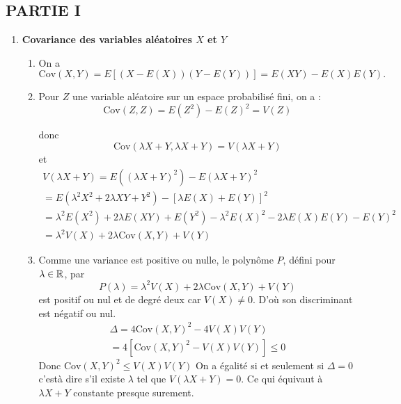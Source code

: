 \subsection*{PARTIE I}

\begin{enumerate}
\item \textbf{Covariance des variables al\'eatoires $X$ et $Y$}

\begin{enumerate}
\item 
On a 
\begin{equation*}
\mathrm{Cov}(X,Y)=E[(X-E(X))(Y-E(Y))]=E(XY)-E(X)E(Y).
\end{equation*}


\item Pour $Z$ une variable aléatoire sur un espace probabilisé fini, on a : $$\mathrm{Cov}\left( Z,Z\right) =E\left(
Z^{2}\right) -E\left( Z\right) ^{2}=V\left( Z\right) $$

donc $$\mathrm{Cov}(\lambda X+Y,\lambda X+Y)=V(\lambda X+Y)$$ et 
\begin{multline*}
V\left( \lambda X+Y\right)
 = E\left( \left( \lambda X+Y\right) ^{2}\right) -E\left( \lambda X+Y\right) ^{2} \\
 = E\left( \lambda ^{2}X^{2}+2\lambda XY+Y^{2}\right) -\left[ \lambda E\left( X\right) +E\left( Y\right) \right] ^{2} \\
 = \lambda ^{2}E\left( X^{2}\right) +2\lambda E\left( XY\right) +E\left(Y^{2}\right) -\lambda ^{2}E\left( X\right) ^{2}-2\lambda E\left( X\right) E\left(Y\right) -E\left( Y\right) ^{2} \\
 = \lambda ^{2}V\left( X\right) +2\lambda \mathrm{Cov}\left( X,Y\right) +V\left( Y\right)
\end{multline*}

\item Comme une variance est positive ou nulle, le polyn\^ome $P$, défini pour $\lambda\in\mathbb{R}$, par 
 $$
P\left( \lambda \right) =\lambda ^{2}V\left( X\right) +2\lambda \mathrm{Cov}
\left( X,Y\right) +V\left( Y\right) $$ 
est positif ou nul et de degré deux car  $V(X)\neq 0$. D'où son discriminant est n\'egatif ou nul.
\begin{multline*}
\Delta = 4\mathrm{Cov}\left( X,Y\right) ^{2}-4V\left( X\right) V\left(Y\right) \\
 = 4\left[ \mathrm{Cov}\left( X,Y\right) ^{2}-V\left( X\right) V\left(Y\right) \right] \leq 0
\end{multline*}
Donc $\mathrm{Cov}\left( X,Y\right) ^{2}\leq V\left( X\right) V\left(Y\right) $\newline
On a \'egalit\'e si et seulement si $\Delta =0$ c'està dire s'il existe $\lambda $ tel que $V\left( \lambda X+Y\right) =0$. Ce qui  \'equivaut \`a $\lambda X+Y$ constante presque surement.


\end{enumerate}
\end{enumerate}
